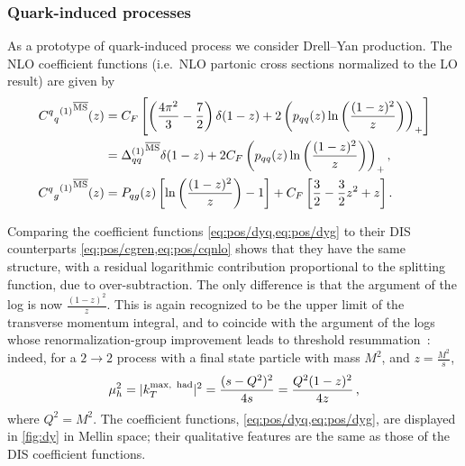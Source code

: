 \subsubsection{Quark-induced processes}
\label{sec:dy}
As a prototype of quark-induced process we consider Drell--Yan
production. The NLO coefficient functions (i.e.\ NLO partonic
cross sections normalized to the LO result) are given by 
\begin{align}\label{eq:pos/dyq}
 {{C^q{}_q}^{(1)}}^{{\overline{\textrm{MS}}}}(z)&= C_F\left[
 \left(\frac{4\pi^2}{3} - \frac 7 2\right)\delta(1-z) + 2
 \left(p_{qq}(z) \ln\left(\frac{(1-z)^2}{z}\right)
 \right)_+\right]\nonumber  \\
 &={\Delta_{qq}^{(1)}}^{{\overline{\textrm{MS}}}}\delta(1-z) + 2 C_F \left(p_{qq}(z) \ln\left(\frac{(1-z)^2}{z}\right) \right)_+,\\
 \label{eq:pos/dyg}
  {{C^q{}_g}^{(1)}}^{{\overline{\textrm{MS}}}}(z)&= P_{qg}(z) \left[ \ln\left(\frac{(1-z)^2}{z}\right) - 1 \right]
  + C_F\left[\frac 3 2 -  \frac 3 2 z^2 + z\right].
\end{align}


Comparing the coefficient functions \cref{eq:pos/dyq,eq:pos/dyg} to their DIS
counterparts \cref{eq:pos/cgren,eq:pos/cqnlo} shows that they have the same
structure, with a residual logarithmic contribution proportional to the
splitting function, due to over-subtraction. The only difference is that the
argument of the log is now $\frac{(1-z)^2}{z}$. 
This is again recognized to be the upper limit of the transverse momentum
integral, and to coincide with the argument of the logs whose
renormalization-group improvement leads to threshold
resummation~\cite{Forte:2002ni}: indeed, for a $2\to2$ process with a final
state particle with mass $M^2$, and $z=\frac{M^2}{s}$,
\begin{equation}\label{eq:pos/ktmaxh}
\mu_h^2=  |k_T^{\textrm{max,\, had}}|^2=\frac{(s-Q^2)^2}{4s}=\frac{Q^2(1-z)^2}{4z}\,,
\end{equation}
where $ Q^2 = M^2 $.
The coefficient functions, \cref{eq:pos/dyq,eq:pos/dyg}, are displayed in
\cref{fig:dy} in Mellin space; their qualitative features are the same as those
of the DIS coefficient functions.

